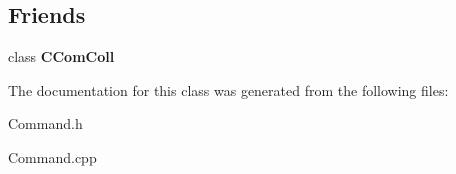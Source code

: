 \subsection*{Friends}
\begin{DoxyCompactItemize}
\item 
\hypertarget{class_c_command_a7b4933228a330ce26d8bc039c271d181}{class {\bfseries C\-Com\-Coll}}\label{class_c_command_a7b4933228a330ce26d8bc039c271d181}

\end{DoxyCompactItemize}


The documentation for this class was generated from the following files\-:\begin{DoxyCompactItemize}
\item 
Command.\-h\item 
Command.\-cpp\end{DoxyCompactItemize}
